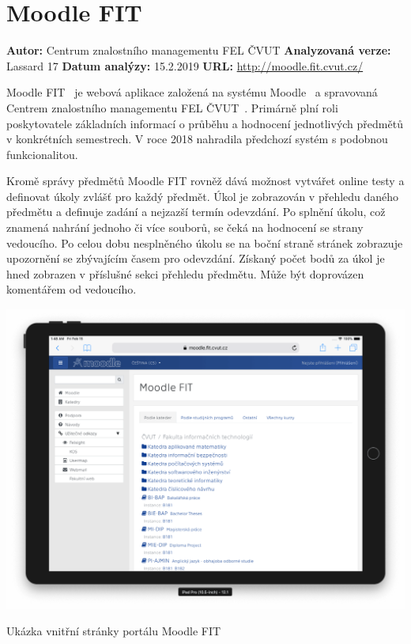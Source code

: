 

\section{Moodle FIT}

\textbf{Autor:} Centrum znalostního managementu FEL ČVUT\newline
\textbf{Analyzovaná verze:} Lassard 17\newline
\textbf{Datum analýzy:} 15.2.2019\newline
\textbf{URL:} \url{http://moodle.fit.cvut.cz/}

Moodle FIT~\cite{moodleFit} je webová aplikace založená na systému Moodle~\cite{moodle} a spravovaná Centrem znalostního managementu FEL ČVUT~\cite{czm}. Primárně plní roli poskytovatele základních informací o průběhu a hodnocení jednotlivých předmětů v konkrétních semestrech. V roce 2018 nahradila předchozí systém s podobnou funkcionalitou.

Kromě správy předmětů Moodle FIT rovněž dává možnost vytvářet online testy a definovat úkoly zvlášť pro každý předmět. Úkol je zobrazován v přehledu daného předmětu a definuje zadání a nejzazší termín odevzdání. Po splnění úkolu, což znamená nahrání jednoho či více souborů, se čeká na hodnocení se strany vedoucího. Po celou dobu nesplněného úkolu se na boční straně stránek zobrazuje upozornění se zbývajícím časem pro odevzdání. Získaný počet bodů za úkol je hned zobrazen v příslušné sekci přehledu předmětu. Může být doprovázen komentářem od vedoucího.


\begin{fig:illustration}
   \includegraphics[width=1\textwidth]{images/analyza-moodle.png}
   \caption{Ukázka vnitřní stránky portálu Moodle FIT}\label{pic:analyza-moodle}
\end{fig:illustration}


